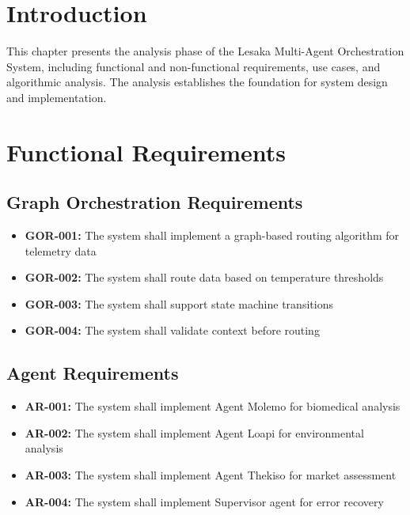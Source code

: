 
\section{Introduction}

This chapter presents the analysis phase of the Lesaka Multi-Agent Orchestration System, including functional and non-functional requirements, use cases, and algorithmic analysis. The analysis establishes the foundation for system design and implementation.

\section{Functional Requirements}

\subsection{Graph Orchestration Requirements}

\begin{itemize}
    \item \textbf{GOR-001:} The system shall implement a graph-based routing algorithm for telemetry data
    \item \textbf{GOR-002:} The system shall route data based on temperature thresholds
    \item \textbf{GOR-003:} The system shall support state machine transitions
    \item \textbf{GOR-004:} The system shall validate context before routing
\end{itemize}

\subsection{Agent Requirements}

\begin{itemize}
    \item \textbf{AR-001:} The system shall implement Agent Molemo for biomedical analysis
    \item \textbf{AR-002:} The system shall implement Agent Loapi for environmental analysis
    \item \textbf{AR-003:} The system shall implement Agent Thekiso for market assessment
    \item \textbf{AR-004:} The system shall implement Supervisor agent for error recovery
\end{itemize}


